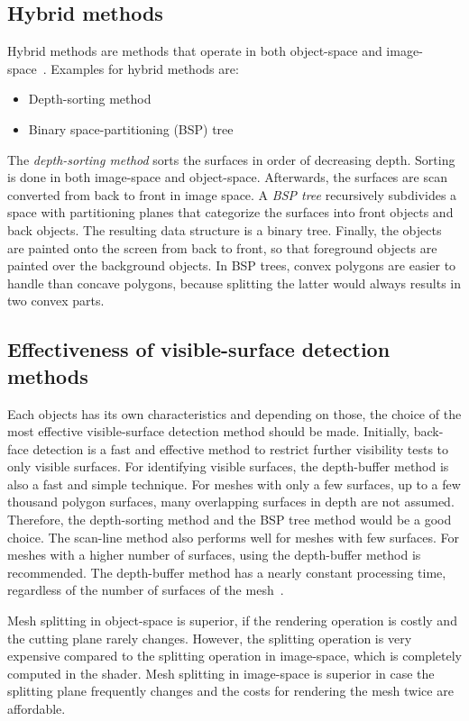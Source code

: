 \subsection{Hybrid methods}
Hybrid methods are methods that operate in both object-space and image-space~\cite{book:computerGraphicsHearn}. Examples for hybrid methods are:
\begin{itemize}
	\item Depth-sorting method
	\item Binary space-partitioning (BSP) tree
\end{itemize}

The \emph{depth-sorting method} sorts the surfaces in order of decreasing depth. Sorting is done in both image-space and object-space. Afterwards, the surfaces are scan converted from back to front in image space. A \emph{BSP tree} recursively subdivides a space with partitioning planes that categorize the surfaces into front objects and back objects. The resulting data structure is a binary tree. Finally, the objects are painted onto the screen from back to front, so that foreground objects are painted over the background objects. In BSP trees, convex polygons are easier to handle than concave polygons, because splitting the latter would always results in two convex parts.

\subsection{Effectiveness of visible-surface detection methods}
Each objects has its own characteristics and depending on those, the choice of the most effective visible-surface detection method should be made. Initially, back-face detection is a fast and effective method to restrict further visibility tests to only visible surfaces. For identifying visible surfaces, the depth-buffer method is also a fast and simple technique. For meshes with only a few surfaces, up to a few thousand polygon surfaces, many overlapping surfaces in depth are not assumed. Therefore, the depth-sorting method and the BSP tree method would be a good choice. The scan-line method also performs well for meshes with few surfaces. For meshes with a higher number of surfaces, using the depth-buffer method is recommended. The depth-buffer method has a nearly constant processing time, regardless of the number of surfaces of the mesh~\cite{book:computerGraphicsHearn}.

Mesh splitting in object-space is superior, if the rendering operation is costly and the cutting plane rarely changes. However, the splitting operation is very expensive compared to the splitting operation in image-space, which is completely computed in the shader. Mesh splitting in image-space is superior in case the splitting plane frequently changes and the costs for rendering the mesh twice are affordable.